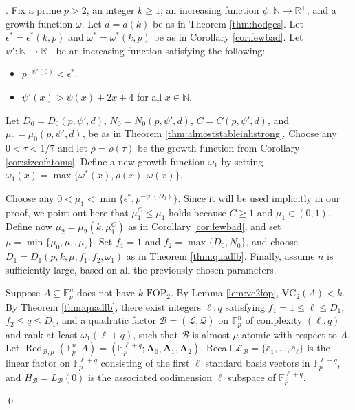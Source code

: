 \documentclass[12pt,oneside,british,a4wide]{amsart}
\numberwithin{equation}{section}
\theoremstyle{definition}
\def\F{\mathbb{F}}
\def\FOP{\mathrm{FOP}}
\def\VC{\mathrm{VC}}
\def\e{\epsilon}
\newcommand{\ebar}{\bar{e}}
\newcommand{\calL}{\mathcal{L}}
\newcommand{\calB}{\mathcal{B}}
\newcommand{\calQ}{\mathcal{Q}}
\newcommand{\Red}{{\mathrm{Red}}}
\def\Red{\operatorname{Red}}
\newenvironment{proofof}[1]{\indent{\itshape Proof of #1}.\;}{\qed}
\begin{document}
\begin{proofof}{Theorem \ref{thm:fop}} Fix a prime $p>2$, an integer $k\geq 1$, an increasing function $\psi:\mathbb{N}\rightarrow \mathbb{R}^+$, and a growth function $\omega$.  Let $d=d(k)$ be as in Theorem \ref{thm:hodges}.  Let $\e^*=\e^*(k,p)$ and $\omega^*=\omega^*(k,p)$ be as in Corollary \ref{cor:fewbad}.  Let $\psi':\mathbb{N}\rightarrow \mathbb{R}^+$ be an increasing function satisfying the following:
\begin{itemize}
\item $p^{-\psi'(0)}<\e^*$.
\item $\psi'(x)>\psi(x)+2x+4$ for all $x\in \mathbb{N}$.
\end{itemize}
Let $D_0=D_0(p,\psi',d)$, $N_0=N_0(p,\psi',d)$, $C=C(p,\psi',d)$, and $\mu_0=\mu_0(p,\psi',d)$,  be as in Theorem \ref{thm:almoststableinhstrong}.  Choose any $0<\tau<1/7$ and let $\rho=\rho(\tau)$ be the growth function from Corollary \ref{cor:sizeofatoms}.  Define a new growth function $\omega_1$ by setting $\omega_1(x)=\max\{\omega^*(x),\rho(x),\omega(x)\}$.

Choose any $0<\mu_1<\min\{\e^*, p^{-\psi'(D_0)}\}$.  Since it will be used implicitly in our proof, we point out here that $\mu_1^C\leq \mu_1$ holds because $C\geq 1$ and $\mu_1\in (0,1)$.   Define now $\mu_2=\mu_2(k,\mu_1^C)$  as in Corollary \ref{cor:fewbad}, and set $\mu=\min\{\mu_0, \mu_1,\mu_2\}$.  Set $f_1=1$ and $f_2=\max\{D_0,N_0\}$, and choose $D_1=D_1(p,k, \mu,f_1,f_2, \omega_1)$   as in Theorem \ref{thm:quadlb}.  Finally, assume $n$ is sufficiently large, based on all the previously chosen parameters.

 
Suppose $A\subseteq \F_p^n$ does not have $k$-$\FOP_2$.  By Lemma \ref{lem:vc2fop}, $\VC_2(A)<k$.  By Theorem \ref{thm:quadlb}, there exist integers $\ell,q$ satisfying $f_1=1\leq \ell\leq D_1$, $f_2\leq q\leq D_1$, and a quadratic factor $\calB=(\calL,\calQ)$ on $\F_p^n$ of complexity $(\ell,q)$ and rank at least $\omega_1(\ell+q)$, such that $\calB$ is almost $\mu$-atomic with respect to $A$.  Let $\Red_{\calB,\mu}(\F_p^n, A)=(\F_p^{\ell+q};\mathbf{A}_0,\mathbf{A}_1,\mathbf{A}_2)$. Recall $\calL_{\calB}=\{\ebar_1,\ldots, \ebar_{\ell}\}$ is the linear factor on $\F_p^{\ell+q}$ consisting of the first $\ell$ standard basis vectors in $\F_p^{\ell+q}$, and $H_{\calB}=L_{\calB}(0)$ is the associated codimension $\ell$ subspace of $\F_p^{\ell+q}$.  


\end{proofof}
\end{document}

